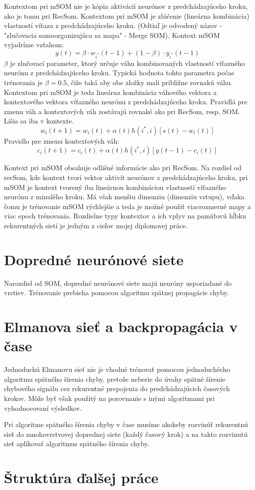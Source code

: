 Kontextom pri mSOM nie je kópia aktivácii neurónov z predchádzajúceho kroku, ako je tomu pri RecSom. 
Kontextom pri mSOM je zlúčenie (lineárna kombinácia) vlastností víťaza z predchádzajúceho kroku.
(Odtiaľ je odvodený názov - "zlučovacia samoorganizujúca sa mapa" - Merge SOM). 
Kontext mSOM vyjadríme vzťahom:
\begin{equation}
	y(t) = \beta \cdot w_{i^{*}}(t-1) + (1 - \beta) \cdot y_{i^{*}}(t-1)
\end{equation}
$\beta$ je zlučovací parameter, ktorý určuje váhu kombinovaných vlastností
víťazného neurónu z predchádzajúceho kroku. Typická hodnota tohto parametra
počas trénovania je $\beta = 0.5$, čiže taká aby obe zložky mali približne 
rovnakú váhu. Kontextom pri mSOM je teda lineárna kombinácia váhového vektora a 
kontextového vektora víťazného neurónu z predchádzajúceho kroku.
Pravidlá pre zmenu váh a kontextových váh zostávajú rovnaké ako pri RecSom, resp. SOM. Líšia sa iba v kontexte.
\begin{equation}
	w_i(t + 1) = w_i(t) + \alpha(t)h(i^*, i)[s(t) - w_i(t)]
\end{equation}
Pravidlo pre zmenu kontextových váh:
\begin{equation}
	c_i(t + 1) = c_i(t) + \alpha(t)h(i^*, i)[y(t - 1) - c_i(t)]
\end{equation}

Kontext pri mSOM obsahuje odlišné informácie ako pri RecSom.
Na rozdiel od recSom, kde kontext tvorí vektor aktivít neurónov z predchádzajúceho kroku, pri
mSOM je kontext tvorený iba lineárnou kombináciou vlastností víťazného neurónu z minulého kroku.
Má však menšiu dimenziu (dimenziu vstupu), vďaka čomu je trénovanie mSOM rýchlejšie a teda je možné použiť 
viacrozmerné mapy a viac epoch trénovania. Rozdielne typy kontextov a ich 
vplyv na pamäťovú hĺbku rekurentných sietí je jedným z cieľov mojej diplomovej práce.

\section{Dopredné neurónové siete}
Narozdiel od SOM, dopredné neurónové siete majú neuróny usporiadané do vrstiev.
Trénovanie prebieha pomocou algoritmu spätnej propagácie chyby.


\section{Elmanova sieť a backpropagácia v čase}
Jednoduchú Elmanovu sieť nie je vhodné trénovať pomocou jednoduchécho algoritmu spätného šírenia chyby, pretože neberie do úvahy spätné šírenie chybového signálu cez rekurentné prepojenia do predchádzajúcich časových krokov.
Môže byť však použitý na porovnanie s inými algoritmami pri vyhodnocovaní výsledkov.

Pri algoritme spätného šírenia chyby v čase musíme akokeby rozvinúť rekurentnú sieť do mnohovrstvovej doprednej siete (každý časový krok) a na takto rozvinutú sieť aplikovať algoritmus spätného šírenia chyby.

\section{Štruktúra ďalšej práce}






